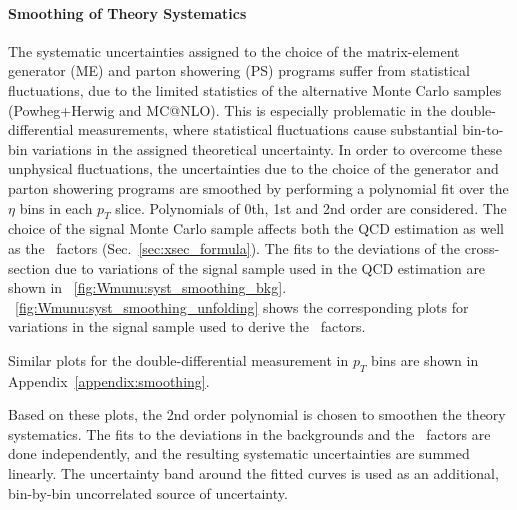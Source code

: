 \paragraph{Smoothing of Theory Systematics}
\label{sys:smoothing}
The systematic uncertainties assigned to the choice of the matrix-element generator (ME) and parton showering (PS) programs suffer from statistical fluctuations, due to the limited statistics of the alternative Monte Carlo samples (Powheg+Herwig and MC@NLO). This is especially problematic in the double-differential measurements, where statistical fluctuations cause substantial bin-to-bin variations in the assigned theoretical uncertainty. In order to overcome these unphysical fluctuations, the uncertainties due to the choice of the generator and parton showering programs are smoothed by performing a polynomial fit over the $\eta$ bins in each $p_T$ slice. Polynomials of 0th, 1st and 2nd order are considered. The choice of the signal Monte Carlo sample affects both the QCD estimation as well as the \C\ factors (Sec.~\ref{sec:xsec_formula}). The fits to the deviations of the cross-section due to variations of the signal sample used in the QCD estimation are shown in \Fig~\ref{fig:Wmunu:syst_smoothing_bkg}. \Fig~\ref{fig:Wmunu:syst_smoothing_unfolding} shows the corresponding plots for variations in the signal sample used to derive the \C\ factors.

Similar plots for the double-differential measurement in $p_T$ bins are shown in Appendix~\ref{appendix:smoothing}.

Based on these plots, the 2nd order polynomial is chosen to smoothen the theory systematics. The fits to the deviations in the backgrounds and the \C\ factors are done independently, and the resulting systematic uncertainties are summed linearly. The uncertainty band around the fitted curves is used as an additional, bin-by-bin uncorrelated source of uncertainty.

